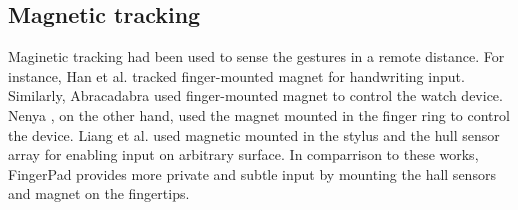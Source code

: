 

\subsection{Magnetic tracking}
Maginetic tracking had been used to sense the gestures in a remote distance. 
For instance, Han et al. \cite{4421009} tracked finger-mounted magnet for handwriting input. 
Similarly, Abracadabra \cite{Harrison:2009} used finger-mounted magnet to control the watch device.
Nenya \cite{Ashbrook:2011}, on the other hand, used the magnet mounted in the finger ring to control the device.
Liang et al. \cite{Liang:2012} used magnetic mounted in the stylus and the hull sensor array for enabling input on arbitrary surface.
In comparrison to these works, FingerPad provides more private and subtle input by mounting the hall sensors and magnet on the fingertips.
 

